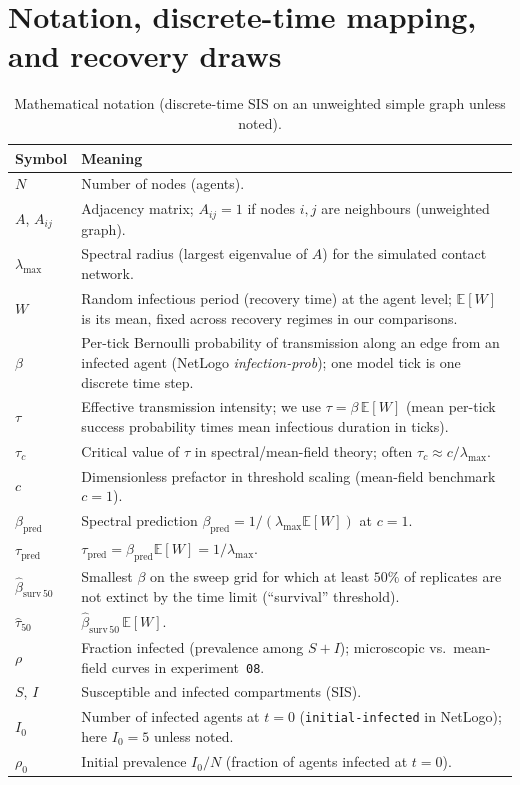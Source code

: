 \documentclass[11pt,a4paper]{article}
\begin{document}
\clearpage
\appendix

\section{Notation, discrete-time mapping, and recovery draws}
\label{app:notation}

\begin{table}[H]
  \centering
  \small
  \caption{Mathematical notation (discrete-time SIS on an unweighted simple graph unless noted).}
  \label{tab:notation}
  \begin{tabularx}{\linewidth}{@{}l X@{}}
    \toprule
    \textbf{Symbol} & \textbf{Meaning} \\
    \midrule
    $N$ & Number of nodes (agents). \\
    $A$, $A_{ij}$ & Adjacency matrix; $A_{ij}{=}1$ if nodes $i,j$ are neighbours (unweighted graph). \\
    $\lambda_{\max}$ & Spectral radius (largest eigenvalue of $A$) for the simulated contact network. \\
    $W$ & Random infectious period (recovery time) at the agent level; $\mathbb{E}[W]$ is its mean, fixed across recovery regimes in our comparisons. \\
    $\beta$ & Per-tick Bernoulli probability of transmission along an edge from an infected agent (NetLogo \emph{infection-prob}); one model tick is one discrete time step. \\
    $\tau$ & Effective transmission intensity; we use $\tau=\beta\,\mathbb{E}[W]$ (mean per-tick success probability times mean infectious duration in ticks). \\
    $\tau_c$ & Critical value of $\tau$ in spectral/mean-field theory; often $\tau_c\approx c/\lambda_{\max}$. \\
    $c$ & Dimensionless prefactor in threshold scaling (mean-field benchmark $c{=}1$). \\
    $\beta_{\mathrm{pred}}$ & Spectral prediction $\beta_{\mathrm{pred}}=1/(\lambda_{\max}\mathbb{E}[W])$ at $c{=}1$. \\
    $\tau_{\mathrm{pred}}$ & $\tau_{\mathrm{pred}}=\beta_{\mathrm{pred}}\mathbb{E}[W]=1/\lambda_{\max}$. \\
    $\hat{\beta}_{\mathrm{surv}\,50}$ & Smallest $\beta$ on the sweep grid for which at least $50\%$ of replicates are not extinct by the time limit (``survival'' threshold). \\
    $\hat{\tau}_{50}$ & $\hat{\beta}_{\mathrm{surv}\,50}\,\mathbb{E}[W]$. \\
    $\rho$ & Fraction infected (prevalence among $S{+}I$); microscopic vs.\ mean-field curves in experiment~\texttt{08}. \\
    $S$, $I$ & Susceptible and infected compartments (SIS). \\
    $I_0$ & Number of infected agents at $t{=}0$ (\texttt{initial-infected} in NetLogo); here $I_0{=}5$ unless noted. \\
    $\rho_0$ & Initial prevalence $I_0/N$ (fraction of agents infected at $t{=}0$). \\
    \bottomrule
  \end{tabularx}
\end{table}
\end{document}
